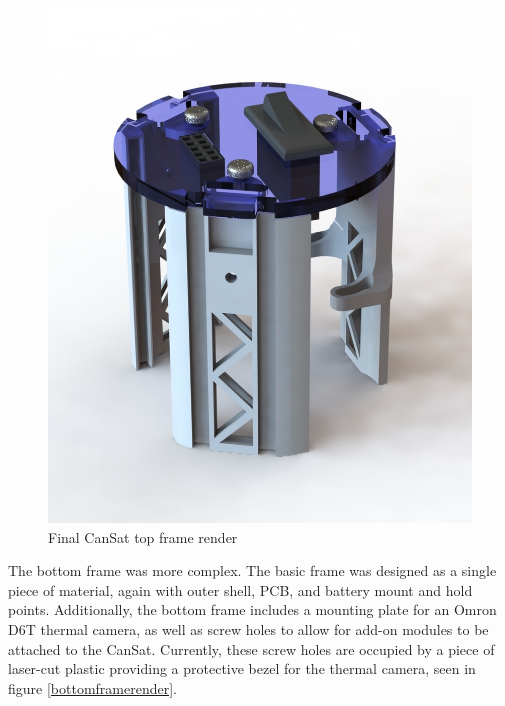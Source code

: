 \documentclass[]{report}
\begin{document}
		
		\begin{figure}[h]
			\hfill\includegraphics[scale=0.4]{Top_frame_render.jpg}\hspace*{\fill}
			\caption{Final CanSat top frame render}
			\label{topframerender}
		\end{figure}
		
		The bottom frame was more complex. The basic frame was designed as a single piece of material, again with outer shell, PCB, and battery mount and hold points. Additionally, the bottom frame includes a mounting plate for an Omron D6T thermal camera, as well as screw holes to allow for add-on modules to be attached to the CanSat. Currently, these screw holes are occupied by a piece of laser-cut plastic providing a protective bezel for the thermal camera, seen in figure \ref{bottomframerender}.
		
\end{document}
